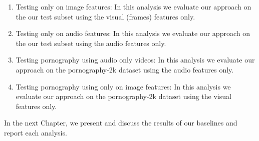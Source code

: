 \begin{enumerate}[start=0,label={(\bfseries E\arabic*):}]



\item Testing only on image features: In this analysis we evaluate our approach on the our test subset using the visual (frames) features only.

\item Testing only on audio features: In this analysis we evaluate our approach on the our test subset using the audio features only.


\item Testing pornography using audio only videos: In this analysis we evaluate our approach on the pornography-2k dataset using the audio features only.

\item Testing pornography using only on image features: In this analysis we evaluate our approach on the pornography-2k dataset using the visual features only.

\end{enumerate}

In the next Chapter, we present and discuss the results of our baselines and report each analysis.